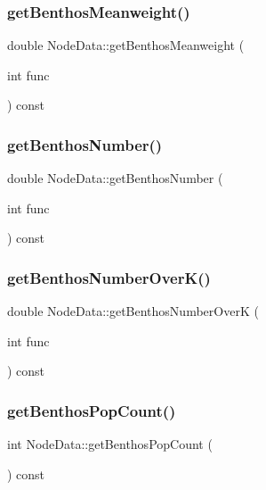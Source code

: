 \subsubsection{\texorpdfstring{getBenthosMeanweight()}{getBenthosMeanweight()}}
{\footnotesize\ttfamily double Node\+Data\+::get\+Benthos\+Meanweight (\begin{DoxyParamCaption}\item[{int}]{func }\end{DoxyParamCaption}) const}

\mbox{\label{class_node_data_aa7c2effc9b13c99c159f533f157afbc7}} 
\subsubsection{\texorpdfstring{getBenthosNumber()}{getBenthosNumber()}}
{\footnotesize\ttfamily double Node\+Data\+::get\+Benthos\+Number (\begin{DoxyParamCaption}\item[{int}]{func }\end{DoxyParamCaption}) const}

\mbox{\label{class_node_data_a4e4503446ae7b004aa9e83d1851441ee}} 
\subsubsection{\texorpdfstring{getBenthosNumberOverK()}{getBenthosNumberOverK()}}
{\footnotesize\ttfamily double Node\+Data\+::get\+Benthos\+Number\+OverK (\begin{DoxyParamCaption}\item[{int}]{func }\end{DoxyParamCaption}) const}

\mbox{\label{class_node_data_aac4449825ea3eb54fb679a0de01316d4}} 
\subsubsection{\texorpdfstring{getBenthosPopCount()}{getBenthosPopCount()}}
{\footnotesize\ttfamily int Node\+Data\+::get\+Benthos\+Pop\+Count (\begin{DoxyParamCaption}{ }\end{DoxyParamCaption}) const}

